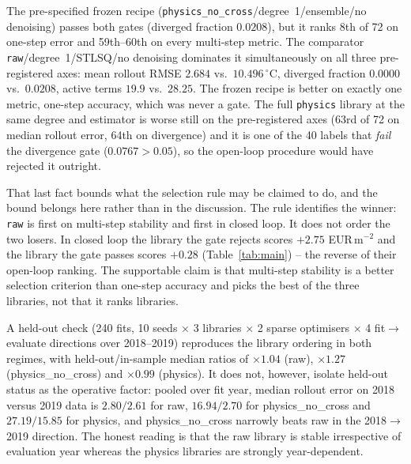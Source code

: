 The pre-specified frozen recipe
(\texttt{physics\_no\_cross}/degree~1/ensemble/no denoising) passes both gates
(diverged fraction $0.0208$), but it ranks 8th of 72 on one-step error and 59th--60th on
every multi-step metric. The comparator \texttt{raw}/degree~1/STLSQ/no denoising
dominates it simultaneously on all three pre-registered axes: mean rollout RMSE $2.684$
vs.\ $10.496\,^\circ$C, diverged fraction $0.0000$ vs.\ $0.0208$, active terms $19.9$ vs.\
$28.25$. The frozen recipe is better on exactly one metric, one-step accuracy, which was
never a gate. The full \texttt{physics} library at the same degree and estimator is worse
still on the pre-registered axes (63rd of 72 on median rollout error, 64th on divergence) and it is one of the 40 labels that \emph{fail} the divergence gate
($0.0767 > 0.05$), so the open-loop procedure would have rejected it outright.

That last fact bounds what the selection rule may be claimed to do, and the bound belongs
here rather than in the discussion. The rule identifies the winner: \texttt{raw} is first
on multi-step stability and first in closed loop. It does not order the two losers. In
closed loop the library the gate rejects scores $+2.75$ EUR\,m$^{-2}$ and the library the
gate passes scores $+0.28$ (Table~\ref{tab:main}) -- the reverse of their open-loop
ranking. The supportable claim is that multi-step stability is a better selection criterion
than one-step accuracy and picks the best of the three libraries, not that it ranks
libraries.

A held-out check (240 fits, 10 seeds $\times$ 3 libraries $\times$ 2 sparse optimisers
$\times$ 4 fit$\to$evaluate directions over 2018--2019) reproduces the library ordering in
both regimes, with held-out/in-sample median ratios of $\times 1.04$ (raw), $\times 1.27$
(physics\_no\_cross) and $\times 0.99$ (physics). It does not, however, isolate held-out
status as the operative factor: pooled over fit year, median rollout error on 2018 versus
2019 data is $2.80/2.61$ for raw, $16.94/2.70$ for physics\_no\_cross and $27.19/15.85$ for
physics, and physics\_no\_cross narrowly beats raw in the 2018$\to$2019 direction. The
honest reading is that the raw library is stable irrespective of evaluation year whereas
the physics libraries are strongly year-dependent.

